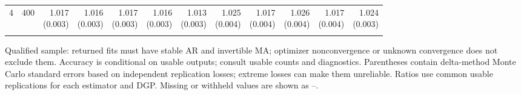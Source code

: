 \begin{table}[p]
{\begin{tabular}{llrrrrrrrrrr}
4 & 400 & \shortstack{1.017\\(0.003)} & \shortstack{1.016\\(0.003)} & \shortstack{1.017\\(0.003)} & \shortstack{1.016\\(0.003)} & \shortstack{1.013\\(0.003)} & \shortstack{1.025\\(0.004)} & \shortstack{1.017\\(0.004)} & \shortstack{1.026\\(0.004)} & \shortstack{1.017\\(0.004)} & \shortstack{1.024\\(0.003)} \\
\addlinespace
\bottomrule\end{tabular}}
\par\medskip
\begin{minipage}{\linewidth}\footnotesize Qualified sample: returned fits must have stable AR and invertible MA; optimizer nonconvergence or unknown convergence does not exclude them. Accuracy is conditional on usable outputs; consult usable counts and diagnostics. Parentheses contain delta-method Monte Carlo standard errors based on independent replication losses; extreme losses can make them unreliable. Ratios use common usable replications for each estimator and DGP.  Missing or withheld values are shown as --.\end{minipage}
\end{table}
